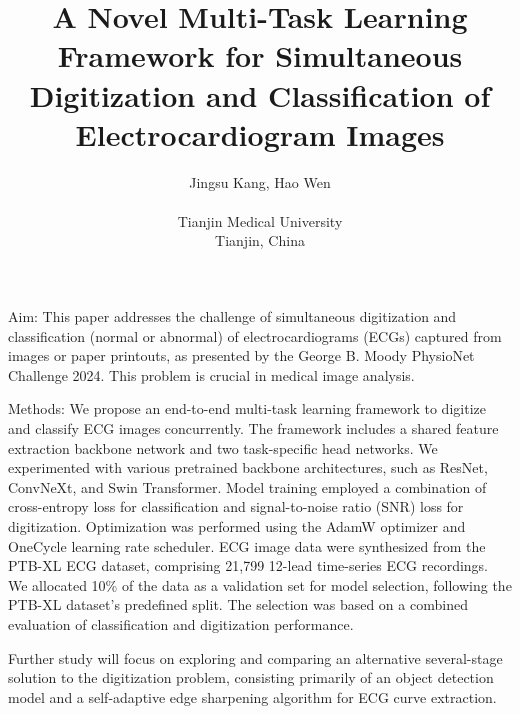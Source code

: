 \documentclass{cinc-abstract}
\begin{document}
\title{A Novel Multi-Task Learning Framework for Simultaneous Digitization and Classification of Electrocardiogram Images}

\author {Jingsu Kang, Hao Wen\\ %
\ \\ %
Tianjin Medical University\\  %
Tianjin, China} %

\maketitle



Aim: This paper addresses the challenge of simultaneous digitization and classification (normal or abnormal) of electrocardiograms (ECGs) captured from images or paper printouts, as presented by the George B. Moody PhysioNet Challenge 2024. This problem is crucial in medical image analysis.

Methods: We propose an end-to-end multi-task learning framework to digitize and classify ECG images concurrently. The framework includes a shared feature extraction backbone network and two task-specific head networks. We experimented with various pretrained backbone architectures, such as ResNet, ConvNeXt, and Swin Transformer. Model training employed a combination of cross-entropy loss for classification and signal-to-noise ratio (SNR) loss for digitization. Optimization was performed using the AdamW optimizer and OneCycle learning rate scheduler. ECG image data were synthesized from the PTB-XL ECG dataset, comprising 21,799 12-lead time-series ECG recordings. We allocated 10\% of the data as a validation set for model selection, following the PTB-XL dataset's predefined split. The selection was based on a combined evaluation of classification and digitization performance.

Further study will focus on exploring and comparing an alternative several-stage solution to the digitization problem, consisting primarily of an object detection model and a self-adaptive edge sharpening algorithm for ECG curve extraction.
\end{document}
